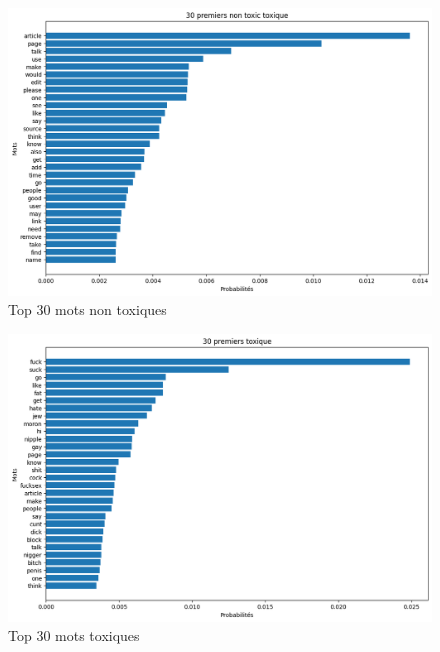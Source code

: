 \begin{figure}[htbp]
    \centering
    \includegraphics[width=.7\linewidth]{figures/30_first_non_toxic-naive_bayes.png}
    \caption{Top 30 mots non toxiques}
\end{figure}

\begin{figure}[htbp]
    \centering
    \includegraphics[width=.7\linewidth]{figures/30_first_toxic-naive_bayes.png}
    \caption{Top 30 mots toxiques}
\end{figure}


